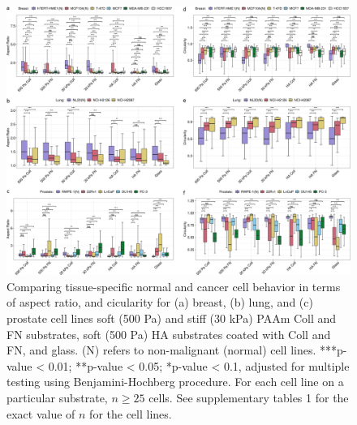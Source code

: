 \documentclass[11pt,letterpaper,english,oneside]{article} %
\begin{document}
\begin{figure}[H]
    \hspace*{-0.8cm}
    \centering
    \includegraphics{../Figures/Supplementary_Figure9/supplementary_figure9.png}
    \caption{Comparing tissue-specific normal and cancer cell behavior in terms of aspect ratio, and cicularity for (a) breast, (b) lung, and (c) prostate cell lines 
    soft (500 Pa) and stiff (30 kPa) PAAm Coll and FN substrates, soft (500 Pa) HA substrates coated with Coll and FN, and glass. (N) refers to non-malignant (normal) cell lines.
    ***p-value < 0.01; **p-value < 0.05; *p-value < 0.1, adjusted for multiple testing using Benjamini-Hochberg procedure. 
    For each cell line on a particular substrate, $n \geq 25$ cells.
    See supplementary tables 1 for the exact value of $n$ for the cell lines.}
    \label{fig:fig9}
\end{figure}
\end{document}
